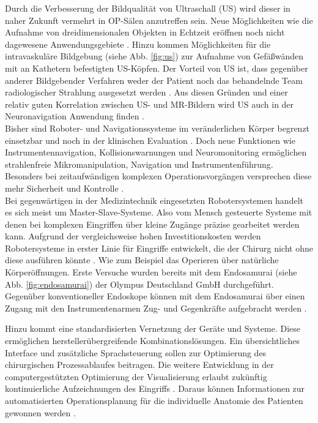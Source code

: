 Durch die Verbesserung der Bildqualität von Ultraschall (US) wird dieser in naher Zukunft vermehrt in OP-Sälen anzutreffen sein. Neue Möglichkeiten wie die Aufnahme von dreidimensionalen Objekten in Echtzeit eröffnen noch nicht dagewesene Anwendungsgebiete \cite{BrainShiftInTumorResection}. Hinzu kommen Möglichkeiten für die intravaskuläre Bildgebung (siehe Abb. \ref{fig:us}) zur Aufnahme von Gefäßwänden mit an Kathetern befestigten US-Köpfen. Der Vorteil von US ist, dass gegenüber anderer Bildgebender Verfahren weder der Patient noch das behandelnde Team radiologischer Strahlung ausgesetzt werden \cite{CurrentAndFuture}. Aus diesen Gründen und einer relativ guten Korrelation zwischen US- und MR-Bildern wird US auch in der Neuronavigation Anwendung finden \cite{BrainShiftInTumorResection}. \\
Bisher sind Roboter- und Navigationssysteme im veränderlichen Körper begrenzt einsetzbar und noch in der klinischen Evaluation \cite{DerDigitaleOperationssaal}. Doch neue Funktionen wie Instrumentennavigation, Kollisionswarnungen und Neuromonitoring ermöglichen strahlenfreie Mikromanipulation, Navigation und Instrumentenführung. Besonders bei zeitaufwändigen komplexen Operationsvorgängen versprechen diese mehr Sicherheit und Kontrolle \cite{DerDigitaleOperationssaal,CurrentAndFuture}. \\
Bei gegenwärtigen in der Medizintechnik eingesetzten Robotersystemen handelt es sich meist um Master-Slave-Systeme. Also vom Mensch gesteuerte Systeme mit denen bei komplexen Eingriffen über kleine Zugänge präzise gearbeitet werden kann. Aufgrund der vergleichsweise hohen Investitionskosten werden Robotersysteme in erster Linie für Eingriffe entwickelt, die der Chirurg nicht ohne diese ausführen könnte \cite{DerDigitaleOperationssaal}. Wie zum Beispiel das Operieren über natürliche Körperöffnungen. Erste Versuche wurden bereits mit dem Endosamurai (siehe Abb. \ref{fig:endosamurai}) der Olympus Deutschland GmbH durchgeführt. Gegenüber konventioneller Endoskope können mit dem Endosamurai über einen Zugang mit den Instrumentenarmen Zug- und Gegenkräfte aufgebracht werden \cite{Endosamurai,DerDigitaleOperationssaal}. 

Hinzu kommt eine standardisierten Vernetzung der Geräte und Systeme. Diese ermöglichen herstellerübergreifende Kombinationslösungen. Ein übersichtliches Interface und zusätzliche Sprachsteuerung sollen zur Optimierung des chirurgischen Prozessablaufes beitragen. Die weitere Entwicklung in der computergestützten Optimierung der Visualisierung erlaubt zukünftig kontinuierliche Aufzeichnungen des Eingriffs \cite{DerDigitaleOperationssaal}. Daraus können Informationen zur automatisierten Operationsplanung für die individuelle Anatomie des Patienten gewonnen werden \cite{CurrentAndFuture}.

